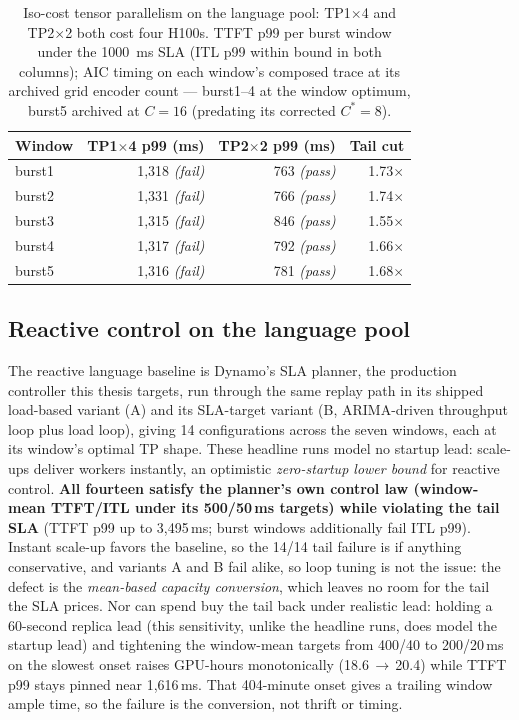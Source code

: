 \begin{table}[htbp]
\centering
\caption[Iso-cost tensor parallelism on the language pool]{Iso-cost tensor
parallelism on the language pool: TP1$\times$4 and TP2$\times$2 both cost four
H100s. TTFT p99 per burst window under the \SI{1000}{\milli\second} SLA (ITL
p99 within bound in both columns); AIC timing on each window's composed trace
at its archived grid encoder count --- burst1--4 at the window optimum, burst5
archived at $C{=}16$ (predating its corrected $C^{*}{=}8$).}
\label{tab:base-tp}
\small
\begin{tabular}{@{}lrrr@{}}
\toprule
Window & TP1$\times$4 p99 (ms) & TP2$\times$2 p99 (ms) & Tail cut \\
\midrule
burst1 & 1{,}318 \emph{(fail)} & 763 \emph{(pass)} & 1.73$\times$ \\
burst2 & 1{,}331 \emph{(fail)} & 766 \emph{(pass)} & 1.74$\times$ \\
burst3 & 1{,}315 \emph{(fail)} & 846 \emph{(pass)} & 1.55$\times$ \\
burst4 & 1{,}317 \emph{(fail)} & 792 \emph{(pass)} & 1.66$\times$ \\
burst5 & 1{,}316 \emph{(fail)} & 781 \emph{(pass)} & 1.68$\times$ \\
\bottomrule
\end{tabular}
\end{table}

\subsection{Reactive control on the language pool}
\label{sec:base-reactive-llm}

The reactive language baseline is Dynamo's SLA planner, the production
controller this thesis targets, run through the same replay path in its
shipped load-based variant (A) and its SLA-target variant (B, ARIMA-driven
throughput loop plus load loop), giving 14 configurations across the seven
windows, each at its window's optimal TP shape. These headline runs model no
startup lead: scale-ups deliver workers instantly, an optimistic
\emph{zero-startup lower bound} for reactive control. \textbf{All fourteen
satisfy the planner's own control law (window-mean TTFT/ITL under its
500/50\,ms targets) while violating the tail SLA} (TTFT p99 up to
3{,}495\,\si{\milli\second}; burst windows additionally fail ITL p99). Instant
scale-up favors the baseline, so the 14/14 tail failure is if anything
conservative, and variants A and B fail alike, so loop tuning is not the issue:
the defect is the \emph{mean-based capacity conversion}, which leaves no room
for the tail the SLA prices. Nor can spend buy the tail back under realistic
lead: holding a 60-second replica lead (this sensitivity, unlike the
headline runs, does model the startup lead) and tightening the window-mean
targets from 400/40 to 200/20\,\si{\milli\second} on the slowest onset raises
GPU-hours monotonically (18.6\,$\to$\,20.4) while TTFT p99 stays pinned near
1{,}616\,\si{\milli\second}. That 404-minute onset gives a trailing window
ample time, so the failure is the conversion, not thrift or timing.

